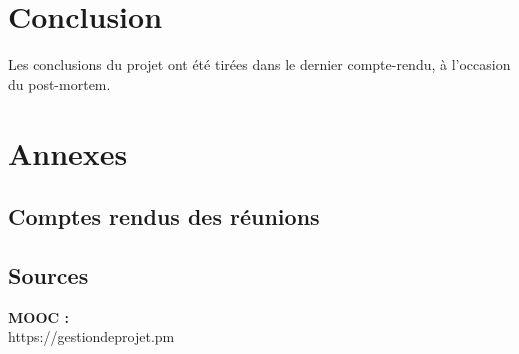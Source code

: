 \documentclass{article}
\begin{document}
\section{Conclusion}

Les conclusions du projet ont été tirées dans le dernier compte-rendu, à l’occasion du post-mortem.


\section*{Annexes}

\subsection*{Comptes rendus des réunions}









\subsection*{Sources}
\textbf{MOOC :} \\
https://gestiondeprojet.pm
\end{document}
